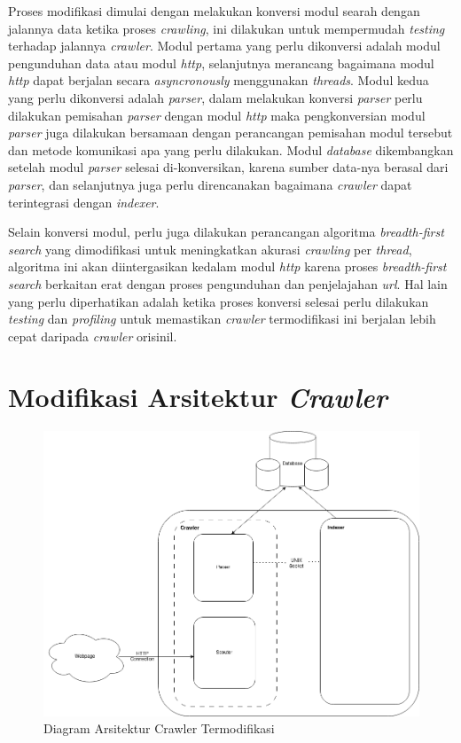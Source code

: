 Proses modifikasi dimulai dengan melakukan konversi modul searah dengan jalannya data ketika proses \emph{crawling}, ini dilakukan untuk mempermudah \emph{testing} terhadap jalannya \emph{crawler}. Modul pertama yang perlu dikonversi adalah modul pengunduhan data atau modul \emph{http}, selanjutnya merancang bagaimana modul \emph{http} dapat berjalan secara \emph{asyncronously} menggunakan \emph{threads}. Modul kedua yang perlu dikonversi adalah \emph{parser}, dalam melakukan konversi \emph{parser} perlu dilakukan pemisahan \emph{parser} dengan modul \emph{http} maka pengkonversian modul \emph{parser} juga dilakukan bersamaan dengan perancangan pemisahan modul tersebut dan metode komunikasi apa yang perlu dilakukan. Modul \emph{database} dikembangkan setelah modul \emph{parser} selesai di-konversikan, karena sumber data-nya berasal dari \emph{parser}, dan selanjutnya juga perlu direncanakan bagaimana \emph{crawler} dapat terintegrasi dengan \emph{indexer}. 

Selain konversi modul, perlu juga dilakukan perancangan algoritma \emph{breadth-first search} yang dimodifikasi untuk meningkatkan akurasi \emph{crawling} per \emph{thread}, algoritma ini akan diintergasikan kedalam modul \emph{http} karena proses \emph{breadth-first search} berkaitan erat dengan proses pengunduhan dan penjelajahan \emph{url}. Hal lain yang perlu diperhatikan adalah ketika proses konversi selesai perlu dilakukan \emph{testing} dan \emph{profiling} untuk memastikan \emph{crawler} termodifikasi ini berjalan lebih cepat daripada \emph{crawler} orisinil.


\section{Modifikasi Arsitektur \emph{Crawler}}

\begin{figure}[H]
	\centering
	\includegraphics[keepaspectratio, width=15cm]{gambar/crawler-multiprocess-architecture.png}
	\caption{Diagram Arsitektur Crawler Termodifikasi}
	\label{gambar:arsitektur_diagram}
\end{figure}

